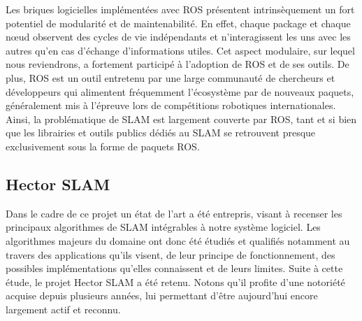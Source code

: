 Les briques logicielles implémentées avec \gls{ROS} présentent intrinsèquement un fort potentiel de modularité et de maintenabilité. 
En effet, chaque package et chaque n\oe{}ud observent des cycles de vie indépendants et n'interagissent les uns avec les autres qu'en cas d'échange d'informations utiles. 
Cet aspect modulaire, sur lequel nous reviendrons, a fortement participé à l'adoption de \gls{ROS} et de ses outils. 
De plus, \gls{ROS} est un outil entretenu par une large communauté de chercheurs et développeurs qui alimentent fréquemment l'écosystème par de nouveaux paquets, généralement mis à l'épreuve lors de compétitions robotiques internationales. 
Ainsi, la problématique de \gls{SLAM} est largement couverte par \gls{ROS}, tant et si bien que les librairies et outils publics dédiés au \gls{SLAM} se retrouvent presque exclusivement sous la forme de paquets \gls{ROS}.

  \subsection{Hector SLAM}
  \label{subsection:hector}
  
Dans le cadre de ce projet un état de l'art a été entrepris, visant à recenser les principaux algorithmes de \gls{SLAM} intégrables à notre système logiciel.
Les algorithmes majeurs du domaine ont donc été étudiés et qualifiés notamment au travers des applications qu'ils visent, de leur principe de fonctionnement, des possibles implémentations qu'elles connaissent et de leurs limites. 
Suite à cette étude, le projet \gls{Hector SLAM} a été retenu. 
Notons qu'il profite d'une notoriété acquise depuis plusieurs années, lui permettant d'être aujourd'hui encore largement actif et reconnu\cite{Bib_Hector_2016}\cite{Bib_Team_Hector}. 

